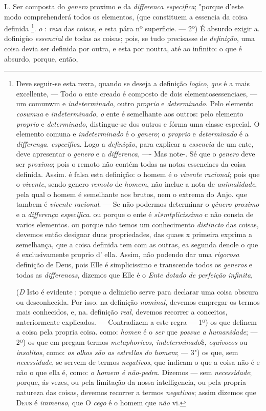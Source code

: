 L. Ser composta do \emph{genero} proximo e da \emph{differenca especifica}; "porque d'este modo comprehenderá todos os elementos, (que constituem a essencia da coisa definida \footnote{Deve seguir-se esta rexra, quando se deseja a definição \emph{logico}, \emph{que} é a mais excellente, --- Todo o ente creado é composto de dois elementosessenciaes, --- um comunwm e \emph{indeterminado}, outro \emph{proprio} e \emph{determinado}. Pelo elemento \emph{cosumua} e \emph{indeterminado}, \emph{o} ente é semelhante aos outros: pelo elemento \emph{proprio} e \emph{determinado}, distingue-se dos outros e fórma uma classe especial. O elemento comuna e \emph{indeterminado} é o \emph{genero}; o \emph{proprio} e \emph{determinado} é a \emph{differenga}. \emph{especifica}. Logo a \emph{definição}, para explicar a \emph{essencia} de um ente, deve apresentar o \emph{genero} e a \emph{differenca}, ---- Mas note-. Sé que o \emph{genero} deve ser \emph{proximo}; pois o remoto não contém todas as notas essenciaes da coisa definida. Assim. é falsa esta definição: o homem é o \emph{vivente racional}; pois que o \emph{vivente}, sendo genero \emph{remoto} de \emph{homem}, não inclue a nota de \emph{animalidade}, pela qual o homem é semelhante aos brutos, nem o extrema do Anjo. que tambem é \emph{vivente racional}. --- Se não podermos determinar o \emph{gênero proximo} e a \emph{differença especifica}. ou porque o ente é \emph{si»mtplicissimo} c não consta de varios elementos. ou porque não temos um conhecimento \emph{distincto} das coisas, devemos então designar duas propriedades, das quaes x primeira exprima a semelhança, que a coisa definida tem com as outras, ea segunda denole o que é exclusivamente proprio d' ella. Assim, não podendo dar uma \emph{rigorosa} definição de Deus, pois Elle é simplicissimo e transcende todos os \emph{generos} e todas as \emph{differencas}, dizemos que Elle é o \emph{Ente dotado de perfeição infinita},\par (\emph{D} Isto é evidente ; porque a delinicüo serve para declarar uma coisa obscura ou desconhecida. Por isso. na definição \emph{nominal}, devemos empregar os termos mais conhecidos, e, na. definição \emph{real}, devemos recorrer a conceitos, anteriormente explicados. --- Contradizem a este regra --- 1º) os que definem a coisa pela propria coisa. como: \emph{homen} é o \emph{ser} que \emph{possue a humanidade}; --- 2º) os que em pregam termos \emph{metaphoricos}, \emph{indeterminado}\$, \emph{equivocos} ou \emph{insolitos}, como: \emph{os olhos são as estrellas do homem}; --- 3") os que, sem \emph{necessidade}, se servem de termos \emph{negativos}, que indicam o que a coisa não é e não o que ella é, como: \emph{o homem é não-pedra}. Dizemos --- sem \emph{necessidade}; porque, ás vezes, ou pela limitação da nossa iatelligeneia, ou pela propria natureza das coisas, devemos recorrer a termos \emph{negativos}; assim dizemos que \textsc{Deus} é \emph{immenso}, que O \emph{cego} é o homem que \emph{não} vi.}. \emph{o} : \emph{reza} das coisas, e esta pára nº superficie. --- 2º) É absurdo exigir a. dofinigüo \emph{essencial} de todas as coisas; pois, se tudo precisasse de \emph{definição}, uma coisa devia ser definida por outra, e esta por noutra, até ao infinito: o que é absurdo, porque, então, 